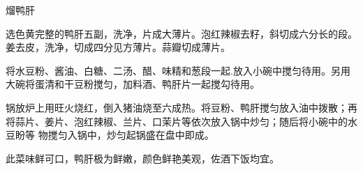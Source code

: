 \begin{recipe}{熘鸭肝}

\ingredients


\preparation

\step 选色黄完整的鸭肝五副，洗净，片成大薄片。泡红辣椒去籽，斜切成六分长的段。
姜去皮，洗净，切成四分见方薄片。蒜瓣切成薄片。

\step 将水豆粉、酱油、白糖、二汤、醋、味精和葱段一起.放入小碗中搅匀待用。另用
大碗将蛋清和干豆粉搅匀，加料酒、鸭肝片一起搅勾待用。

\step 锅放炉上用旺火烧红，倒入猪油烧至六成热。将豆粉、鸭肝搅匀放入油中拨散；再
将蒜片、姜片、泡红辣椒、兰片、口茉片等依次放入锅中炒匀；随后将小碗中的水豆盼等
物搅匀入锅中，炒匀起锅盛在盘中即成。

\features

此菜味鲜可口，鸭肝极为鲜嫩，颜色鲜艳美观，佐酒下饭均宜。

\end{recipe}

